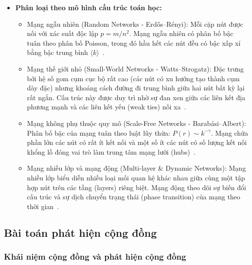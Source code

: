 \documentclass[14pt,a4paper]{extarticle}
\begin{document}
\begin{itemize}
    \item \textbf{Phân loại theo mô hình cấu trúc toán học:}
    \begin{itemize}
        \item Mạng ngẫu nhiên (Random Networks - Erd\H{os--R\'enyi):} Mỗi cặp nút được nối với xác suất độc lập $p = m/n^2$. Mạng ngẫu nhiên có phân bố bậc tuân theo phân bố Poisson, trong đó hầu hết các nút đều có bậc xấp xỉ bằng bậc trung bình $\langle k \rangle$~\cite{Traag2014}.
        \item Mạng thế giới nhỏ (Small-World Networks - Watts--Strogatz): Đặc trưng bởi hệ số gom cụm cục bộ rất cao (các nút có xu hướng tạo thành cụm dày đặc) nhưng khoảng cách đường đi trung bình giữa hai nút bất kỳ lại rất ngắn. Cấu trúc này được duy trì nhờ sự đan xen giữa các liên kết địa phương mạnh và các liên kết yếu (weak ties) nối xa~\cite{Scott2012}.
        \item Mạng không phụ thuộc quy mô (Scale-Free Networks - Barab\'asi--Albert): Phân bố bậc của mạng tuân theo luật lũy thừa: $P(r) \sim k^{-\gamma}$. Mạng chứa phần lớn các nút có rất ít kết nối và một số ít các nút có số lượng kết nối khổng lồ đóng vai trò làm trung tâm mạng lưới (hubs)~\cite{Traag2014}.
        \item Mạng nhiều lớp và mạng động (Multi-layer \& Dynamic Networks): Mạng nhiều lớp biểu diễn nhiều loại mối quan hệ khác nhau giữa cùng một tập hợp nút trên các tầng (layers) riêng biệt. Mạng động theo dõi sự biến đổi cấu trúc và sự dịch chuyển trạng thái (phase transition) của mạng theo thời gian~\cite{Traag2014, Scott2012}.
    \end{itemize}
\end{itemize}

\subsection{Bài toán phát hiện cộng đồng}

\subsubsection{Khái niệm cộng đồng và phát hiện cộng đồng}
\end{document}
